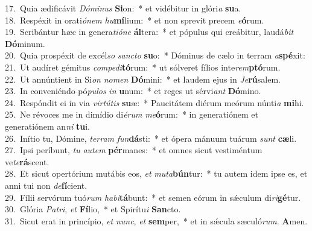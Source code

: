 {17.~}Quia ædificávit \textit{Dó}\textit{mi}\textit{nus} \textbf{Si}on:~* et vidébitur in glóri\textit{a} \textbf{su}a.\\
{18.~}Respéxit in orati\textit{ó}\textit{nem} \textit{hu}\textbf{mí}lium:~* et non sprevit precem \textit{e}\textbf{ó}rum.\\
{19.~}Scribántur hæc in genera\textit{ti}\textit{ó}\textit{ne} \textbf{ál}tera:~* et pópulus qui creábitur, laudá\textit{bit} \textbf{Dó}minum.\\
{20.~}Quia prospéxit de excél\textit{so} \textit{san}\textit{cto} \textbf{su}o:~* Dóminus de cælo in terram \textit{a}\textbf{spé}xit:\\
{21.~}Ut audíret gémitus \textit{com}\textit{pe}\textit{di}\textbf{tó}rum:~* ut sólveret fílios inte\textit{rem}\textbf{ptó}rum.\\
{22.~}Ut annúntient in Si\textit{on} \textit{no}\textit{men} \textbf{Dó}mini:~* et laudem ejus in \textit{Je}\textbf{rú}salem.\\
{23.~}In conveniéndo pó\textit{pu}\textit{los} \textit{in} \textbf{u}num:~* et reges ut sérvi\textit{ant} \textbf{Dó}mino.\\
{24.~}Respóndit ei in via \textit{vir}\textit{tú}\textit{tis} \textbf{su}æ:~* Paucitátem diérum meórum núnti\textit{a} \textbf{mi}hi.\\
{25.~}Ne révoces me in dimídio di\textit{é}\textit{rum} \textit{me}\textbf{ó}rum:~* in generatiónem et generatiónem an\textit{ni} \textbf{tu}i.\\
{26.~}Inítio tu, Dómine, \textit{ter}\textit{ram} \textit{fun}\textbf{dá}sti:~* et ópera mánuum tuárum \textit{sunt} \textbf{cæ}li.\\
{27.~}Ipsi períbunt, \textit{tu} \textit{au}\textit{tem} \textbf{pér}manes:~* et omnes sicut vestiméntum ve\textit{te}\textbf{rá}scent.\\
{28.~}Et sicut opertórium mutábis eos, \textit{et} \textit{mu}\textit{ta}\textbf{bún}tur:~* tu autem idem ipse es, et anni tui non \textit{de}\textbf{fí}cient.\\
{29.~}Fílii servórum tuó\textit{rum} \textit{ha}\textit{bi}\textbf{tá}bunt:~* et semen eórum in sǽculum di\textit{ri}\textbf{gé}tur.\\
{30.~}Glória \textit{Pa}\textit{tri}, \textit{et} \textbf{Fí}lio,~* et Spirítu\textit{i} \textbf{San}cto.\\
{31.~}Sicut erat in princípio, \textit{et} \textit{nunc}, \textit{et} \textbf{sem}per,~* et in sǽcula sæculó\textit{rum}. \textbf{A}men.\\
